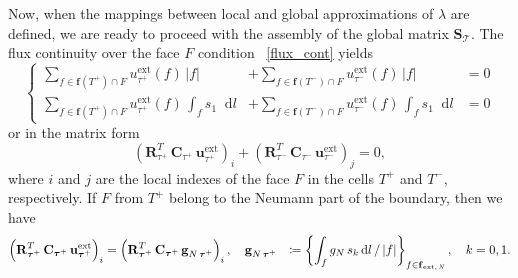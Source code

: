 \documentclass[12pt]{article}
\newcommand{\vect}[1]{\boldsymbol{\mathbf{#1}}}
\newcommand{\bmesh}{{\vect{\mathcal T}}}
\newcommand{\mmesh}{{\vect{\mathcal \tau}}}
\newcommand{\mfaces}[1][]{{\vect{ f}_{\text{#1}}}}
\newcommand*\diff{\mathop{}\!\mathrm{d}}
\begin{document}
	
Now, when the mappings between local and global approximations of $\lambda$ are defined, we are ready to proceed with the assembly of the global matrix $\vect S_\bmesh$. 	The flux continuity over the face $F$ condition ~\eqref{flux_cont} yields
	\begin{equation*}
\left\{
\begin{split}
		\sum_{f\in \mfaces(T^+)\cap F} u^{\text{ext}}_{\mmesh^+}(f)\,|f| &+ \sum_{f\in \mfaces(T^-)\cap F} u^{\text{ext}}_{\mmesh^-}(f)\,|f| &= 0 \\
		\sum_{f\in \mfaces(T^+)\cap F} u^{\text{ext}}_{\mmesh^+}(f)\,\int_{f} s_1 \diff{l} &+ \sum_{f\in \mfaces(T^-)\cap F} u^{\text{ext}}_{\mmesh^-}(f)\,\int_{f} s_1 \diff{l} &= 0
\end{split}
\right.
	\end{equation*}
	or in the matrix form
	\begin{equation}\label{eq:aux1}
		\left( \vect R^T_{\mmesh^+}\,\vect C_{\mmesh^+}\,{\vect u}^{\text{ext}}_{\mmesh^+} \right)_i + \left( \vect R^T_{\mmesh^-}\,\vect C_{\mmesh^-}\,{\vect u}^{\text{ext}}_{\mmesh^-} \right)_j = 0,
	\end{equation}
where $i$ and $j$ are the local indexes of the face $F$ in the cells $T^+$ and $T^-$, respectively.
If $F$ from $T^+$ belong to the Neumann part of the boundary, then we have
	\begin{align*}
		\left( \vect R^T_{\mmesh^+}\,\vect C_{\mmesh^+}\,{\vect u}^{\text{ext}}_{\mmesh^+} \right)_i &= \left( \vect R^T_{\mmesh^+}\,\vect C_{\mmesh^+}\,{\vect g}_{N\,\mmesh^+} \right)_i, \quad
		{\vect g}_{N\,\mmesh^+} &\coloneqq \left\{ \int_f g_N\,s_k \diff{l}\,/\,|f| \right\}_{f \in \mfaces[ext,\,\textit{N}]}, \quad k = 0, 1.
	\end{align*}
	
\end{document}
